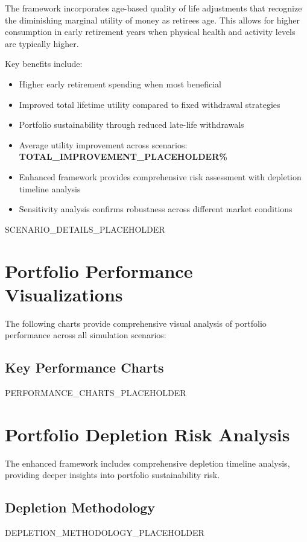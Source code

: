 \documentclass[11pt,a4paper]{article}
\begin{document}
The framework incorporates age-based quality of life adjustments that recognize the diminishing marginal utility of money as retirees age. This allows for higher consumption in early retirement years when physical health and activity levels are typically higher.

Key benefits include:
\begin{itemize}
    \item Higher early retirement spending when most beneficial
    \item Improved total lifetime utility compared to fixed withdrawal strategies  
    \item Portfolio sustainability through reduced late-life withdrawals
    \item Average utility improvement across scenarios: \textbf{TOTAL_IMPROVEMENT_PLACEHOLDER\%}
    \item Enhanced framework provides comprehensive risk assessment with depletion timeline analysis
    \item Sensitivity analysis confirms robustness across different market conditions
\end{itemize}

SCENARIO_DETAILS_PLACEHOLDER

\section{Portfolio Performance Visualizations}

The following charts provide comprehensive visual analysis of portfolio performance across all simulation scenarios:

\subsection{Key Performance Charts}

PERFORMANCE_CHARTS_PLACEHOLDER

\section{Portfolio Depletion Risk Analysis}

The enhanced framework includes comprehensive depletion timeline analysis, providing deeper insights into portfolio sustainability risk.

\subsection{Depletion Methodology}
DEPLETION_METHODOLOGY_PLACEHOLDER
\end{document}
